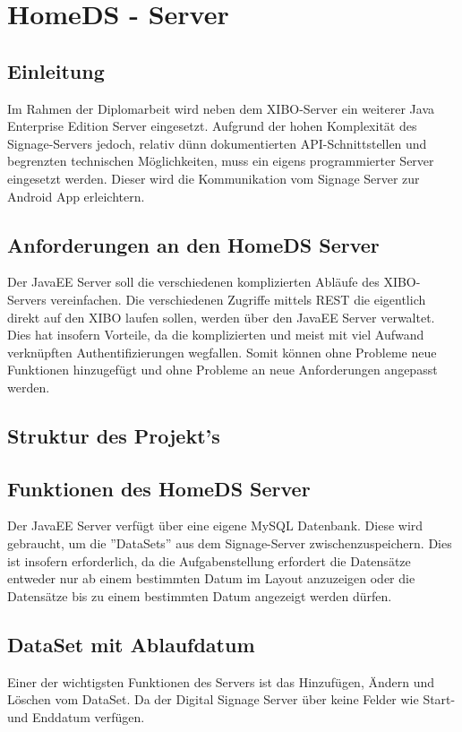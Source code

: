 \chapter{HomeDS - Server}
\section{Einleitung}\label{sec:einleitung}
Im Rahmen der Diplomarbeit wird neben dem XIBO-Server ein weiterer Java Enterprise Edition Server eingesetzt. Aufgrund der hohen Komplexität des Signage-Servers jedoch, relativ dünn dokumentierten API-Schnittstellen und begrenzten technischen Möglichkeiten, muss ein eigens programmierter Server eingesetzt werden. Dieser wird die Kommunikation vom Signage Server zur Android App erleichtern. 
 
\section{Anforderungen an den HomeDS Server}\label{sec:homeds}
Der JavaEE Server soll die verschiedenen komplizierten Abläufe des XIBO-Servers vereinfachen. Die verschiedenen Zugriffe mittels REST die eigentlich direkt auf den XIBO laufen sollen, werden über den JavaEE Server verwaltet. Dies hat insofern Vorteile, da die komplizierten und meist mit viel Aufwand verknüpften Authentifizierungen wegfallen. Somit können ohne Probleme neue Funktionen hinzugefügt und ohne Probleme an neue Anforderungen angepasst werden.

\section{Struktur des Projekt's}\label{sec:javaee}
 
\section{Funktionen des HomeDS Server}\label{sec:homedsfunction}
Der JavaEE Server verfügt über eine eigene MySQL Datenbank. Diese wird gebraucht, um die ''DataSets'' aus dem Signage-Server zwischenzuspeichern. Dies ist insofern erforderlich, da die Aufgabenstellung erfordert die Datensätze entweder nur ab einem bestimmten Datum im Layout anzuzeigen oder die Datensätze bis zu einem bestimmten Datum angezeigt werden dürfen. 
 
\section{DataSet mit Ablaufdatum}\label{sec:datasetexpiredate}
Einer der wichtigsten Funktionen des Servers ist das Hinzufügen, Ändern und Löschen vom DataSet. Da der Digital Signage Server über keine Felder wie Start- und Enddatum verfügen.

